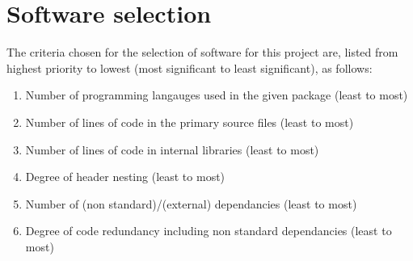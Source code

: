 \section{Software selection}\label{Software selection}

The criteria chosen for the selection of software for this project are, listed from highest priority to lowest (most significant to least significant), as follows:

\begin{enumerate}
    \item Number of programming langauges used in the given package (least to most)
    \item Number of lines of code in the primary source files (least to most)
    \item Number of lines of code in internal libraries (least to most)
    \item Degree of header nesting (least to most)
    \item Number of (non standard)/(external) dependancies (least to most)
    \item Degree of code redundancy including non standard dependancies (least to most)
\end{enumerate}
